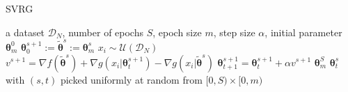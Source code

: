 \documentclass{article}
\theoremstyle{remark}
\theoremstyle{definition}
\newcommand{\vtheta}{\boldsymbol{\theta}}
\begin{document}
\begin{algorithm}[tb]
	\caption{SVRG}
	\label{alg:svrg}
	\begin{algorithmic}
             a dataset $\mathcal{D}_N$, number of epochs $S$, epoch size $m$, step size $\alpha$, initial parameter $\vtheta_{m}^0$
		\STATE $\vtheta_0^{s+1} := \widetilde{\vtheta}^s := \vtheta_{m}^s$
        \STATE $x_i \sim \mathcal{U}\left(\mathcal{D}_N\right)$
		\STATE $v^{s+1} = 
			\nabla f(\widetilde{\vtheta}^s) + 
			\nabla g(x_i|\vtheta_t^{s+1}) -
			\nabla g(x_i|\widetilde{\vtheta}^{s})
		$
        \STATE $\vtheta_{t+1}^{s+1} = \vtheta_t^{s+1} + \alpha v^{s+1}$
		\ENDFOR
		\ENDFOR
		 $\vtheta_{m}^S$
		 $\vtheta_t^s$ with $(s,t)$ picked uniformly at random from $[0,S)\times[0,m)$
	\end{algorithmic}
\end{algorithm}
\end{document}
